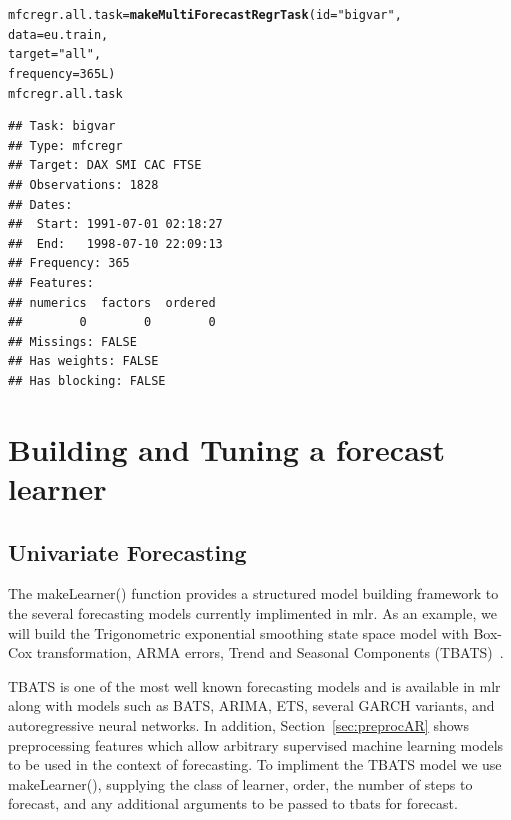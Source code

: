 \documentclass[12pt]{article}\usepackage[]{graphicx}\usepackage[]{color}
\makeatletter
\newcommand{\hlnum}[1]{\textcolor[rgb]{0.686,0.059,0.569}{#1}}%
\newcommand{\hlstr}[1]{\textcolor[rgb]{0.192,0.494,0.8}{#1}}%
\newcommand{\hlstd}[1]{\textcolor[rgb]{0.345,0.345,0.345}{#1}}%
\newcommand{\hlkwb}[1]{\textcolor[rgb]{0.69,0.353,0.396}{#1}}%
\newcommand{\hlkwc}[1]{\textcolor[rgb]{0.333,0.667,0.333}{#1}}%
\newcommand{\hlkwd}[1]{\textcolor[rgb]{0.737,0.353,0.396}{\textbf{#1}}}%
\newenvironment{kframe}{%
 \def\at@end@of@kframe{}%
 \ifinner\ifhmode%
  \def\at@end@of@kframe{\end{minipage}}%
  \begin{minipage}{\columnwidth}%
 \fi\fi%
 \def\FrameCommand##1{\hskip\@totalleftmargin \hskip-\fboxsep
 \colorbox{shadecolor}{##1}\hskip-\fboxsep
     \hskip-\linewidth \hskip-\@totalleftmargin \hskip\columnwidth}%
 \MakeFramed {\advance\hsize-\width
   \@totalleftmargin\z@ \linewidth\hsize
   \@setminipage}}%
 {\par\unskip\endMakeFramed%
 \at@end@of@kframe}
\newenvironment{knitrout}{}{} %
\theoremstyle{definition}
\newcommand\code{\@codex}
\def\@codex#1{{\normalfont\ttfamily\hyphenchar\font=-1 #1}}
\newcommand{\pkg}[1]{{\fontseries{b}\selectfont #1}}
\makeatother
\begin{document}
\singlespacing
\begin{knitrout}
\color{fgcolor}\begin{kframe}
\begin{alltt}
\hlstd{mfcregr.all.task} \hlkwb{=} \hlkwd{makeMultiForecastRegrTask}\hlstd{(}\hlkwc{id} \hlstd{=} \hlstr{"bigvar"}\hlstd{,}
                                             \hlkwc{data} \hlstd{= eu.train,}
                                             \hlkwc{target} \hlstd{=} \hlstr{"all"}\hlstd{,}
                                             \hlkwc{frequency} \hlstd{=} \hlnum{365L}\hlstd{)}
\hlstd{mfcregr.all.task}
\end{alltt}
\begin{verbatim}
## Task: bigvar
## Type: mfcregr
## Target: DAX SMI CAC FTSE
## Observations: 1828
## Dates:
##  Start: 1991-07-01 02:18:27 
##  End:   1998-07-10 22:09:13
## Frequency: 365
## Features:
## numerics  factors  ordered 
##        0        0        0 
## Missings: FALSE
## Has weights: FALSE
## Has blocking: FALSE
\end{verbatim}
\end{kframe}
\end{knitrout}
\doublespacing

\section{Building and Tuning a forecast learner}
\label{seq:buildAndTune}
\subsection{Univariate Forecasting}
\label{seq:buildAndTuneUni}
The \code{makeLearner()} function provides a structured model building framework to the several forecasting models currently implimented in \pkg{mlr}. As an example, we will build the Trigonometric exponential smoothing state space model with Box-Cox transformation, ARMA errors, Trend and Seasonal Components (TBATS)~\cite{tbats}.

TBATS is one of the most well known forecasting models and is available in \pkg{mlr} along with models such as BATS, ARIMA, ETS, several GARCH variants, and autoregressive neural networks. In addition, Section~\ref{sec:preprocAR} shows preprocessing features which allow arbitrary supervised machine learning models to be used in the context of forecasting. To impliment the TBATS model we use  \code{makeLearner()}, supplying the class of learner, order, the number of steps to forecast, and any additional arguments to be passed to \code{tbats} for \pkg{forecast}. 
\end{document}
